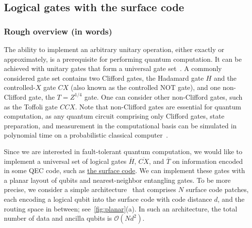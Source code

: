 \begin{refsection}
\section{Logical gates with the surface code}
\label{prim:LatticeSurgery}


\subsubsection*{Rough overview (in words)}


The ability to implement an arbitrary unitary operation, either exactly or approximately, is a prerequisite for performing quantum computation.
It can be achieved with unitary gates that form a universal gate set~\cite{kitaev1997quantumComputationsAlgosQEC,nielsen2002QCQI}.
A commonly considered gate set contains two Clifford gates, the Hadamard gate $H$ and the controlled-$X$ gate $CX$ (also known as the controlled NOT gate), and one non-Clifford gate, the $T = Z^{1/4}$ gate.
One can consider other non-Clifford gates, such as the Toffoli gate $CCX$.
Note that non-Clifford gates are essential for quantum computation, as any quantum circuit comprising only Clifford gates, state preparation, and measurement in the computational basis can be simulated in polynomial time on a probabilistic classical computer~\cite{gottesman1998HeisenbergRepresentation,aaronson2004improvedSimulationStabilizer}.


Since we are interested in fault-tolerant quantum computation, we would like to implement a universal set of logical gates $\overline H$, $\overline{CX}$, and $\overline T$ on information encoded in some QEC code, such as \hyperref[prim:QEC]{the surface code}.
We can implement these gates with a planar layout of qubits and nearest-neighbor entangling gates.
To be more precise, we consider a simple architecture~\cite{horsman2012latticeSurgery} that comprises $N$ surface code patches, each encoding a logical qubit into the surface code with code distance $d$, and the routing space in between; see~\cref{fig:planar}(a).
In such an architecture, the total number of data and ancilla qubits is $\mathcal O(N d^2)$.



\end{refsection}
